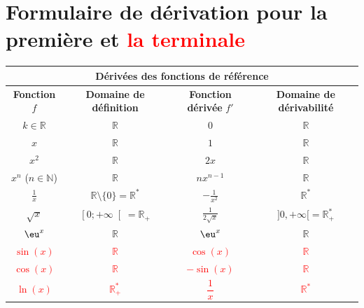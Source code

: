 \documentclass[main.tex]{subfiles}
\begin{document}
\section[Formulaire]{Formulaire de dérivation pour la première et \textcolor{red}{la terminale}} 
\begin{center}
	\renewcommand{\arraystretch}{1.8}
	\begin{tabular}{|c|c||c|c|}
		\hline 
			\multicolumn{4}{|c|}{\textbf{Dérivées des fonctions de référence} }\\
		\hline
		\textbf{Fonction} $f$ & \textbf{Domaine de définition} & \textbf{Fonction dérivée} $f'$ & \textbf{Domaine de dérivabilité}\\
		\hline
		$k \in \mathbb{R}$ & $\mathbb{R}$ & 0 &$\mathbb{R}$\\
		\hline
		$x$ & $\mathbb{R}$ & $1$&$ \mathbb{R}$ \\
		\hline
		$x^2$ & $\mathbb{R}$& $ 2x$  & $\mathbb{R}$ \\
		\hline
		$x^n$ ($n\in \mathbb{N}$)&$\mathbb{R}$ & $nx^{n-1}$ & $\mathbb{R}$ \\
		\hline
		$\displaystyle\frac{1}{x}$ &$\mathbb{R}\setminus\{0\} = \mathbb{R}^{*}$  & $-\displaystyle\frac{1}{x^2}$ & $\mathbb{R}^{*}$ \\
		\hline
		$\sqrt{x}$ & $\left[0; +\infty \right[ = \mathbb{R}_{+}$& $\displaystyle\frac{1}{2\sqrt{x}}$& $]0,+\infty[ = \mathbb{R}^{*}_{+}$\\
		\hline
		$\eu^x$& $\mathbb{R}$& $\eu^x$ & $\mathbb{R}$\\
		\hline
		\textcolor{red}{$\sin (x)$}& \textcolor{red}{$\mathbb{R}$}& \textcolor{red}{$\cos (x)$} & \textcolor{red}{$\mathbb{R}$}\\
		\hline
		\textcolor{red}{$\cos (x)$} & \textcolor{red}{$\mathbb{R}$}& \textcolor{red}{$-\sin (x)$} & \textcolor{red}{$\mathbb{R}$}\\
		\hline
		\textcolor{red}{$\ln (x)$}& \textcolor{red}{$\mathbb{R}^{*}_{+}$}& \textcolor{red}{$\dfrac{1}{x}$} & \textcolor{red}{$\mathbb{R}^{*}$}\\
		\hline
	\end{tabular}


\end{center}
\end{document}
